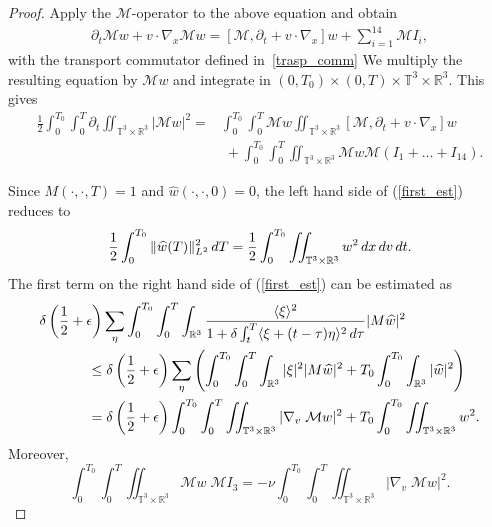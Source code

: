 \documentclass[10pt,a4paper]{amsart}
\newcommand{\CalM}{\mathcal{M}}
\newcommand{\Eps}{\epsilon}
\newcommand{\R}{\mathbb R}
\newcommand{\T}{\mathbb{T}}
\newcommand{\dT}{\, {\rm d} T}
\newcommand{\del}{\partial}
\newcommand{\dtau}{\, {\rm d} \tau}
\newcommand{\dt}{\, {\rm d} t}
\newcommand{\dv}{\, {\rm d} v}
\newcommand{\dx}{\, {\rm d} x}
\newcommand{\vpran}[1]{\left(#1\right)}
\begin{document}
\begin{proof}
Apply the $\CalM$-operator to the above equation and obtain 
\begin{align*}
  \del_t \CalM w  + v \cdot \nabla_x \CalM w
= [\CalM, \partial_t + v \cdot \nabla_x]w + \sum_{i=1}^{14} \CalM  I_i   ,
\end{align*}
with the transport commutator defined in~\eqref{trasp_comm}
We multiply the resulting equation by ${{\CalM} w}$ and integrate in $(0, T_0) \times (0,T) \times \T^3 \times \R^3$. This gives
\begin{align} \label{first_est}
\frac{1}{2}\int_0^{T_0} \int_0^{T}   \partial _t \iint_{\T^3 \times \R^3} |{\CalM} w|^2 
= & \int_0^{T_0}  \int_0^{T}  {\CalM} w  \iint_{\T^3 \times \R^3} [\CalM, \partial_t + v \cdot \nabla_x]w %
\nonumber 
\\
&\;+ \int_0^{T_0}  \int_0^{T}  \iint_{\T^3 \times \R^3}  {{\CalM}w} {\CalM} ( {I_1} + ...+  {I_{14}}). %
\end{align}


Since ${M}(\cdot,\cdot,T)=1$ and $\widehat w(\cdot,\cdot,0)=0$, the left hand side of (\ref{first_est}) reduces to 
$$
\frac{1}{2} \int_0^{T_0} \|\widehat w(T) \|_{L^2}^2 \dT = \frac{1}{2} \int_0^{T_0} \iint_{\T^3 \times \R^3}  w^2 \dx\dv\dt .
$$
The first term on the right hand side of (\ref{first_est}) can be estimated as 
\begin{align*}
 \delta \left(\frac{1}{2}+ \Eps\right)& \sum_{\eta}\int_0^{T_0} \int_0^T \int_{\R^3} \frac{ \langle \xi \rangle^{2}}{{ 1 + \delta \int_t ^T \langle \xi +(t- \tau) \eta\rangle^{2} \dtau}} |{M}\widehat w|^2 %
\\
 \le  & \;\delta  \left(\frac{1}{2}+ \Eps\right)\sum_{\eta} \left( \int_0^{T_0} \int_0^T \int_{\R^3}   
 | \xi |^{2}  |{M}\widehat w|^2 %
 + T_0 \int_0^{T_0} \int_{\R^3}  |\widehat w|^2 
 \right)
\\
 = & \;\delta  \left(\frac{1}{2}+ \Eps\right) \int_0^{T_0} \int_0^T \iint_{\T^3 \times \R^3} |\nabla_v \;\CalM w|^2 %
 + T_0 \int_0^{T_0} \iint_{\T^3 \times \R^3}   w^2. %
\end{align*}
Moreover, 
$$
 \int_0^{T_0} \int_0^T   \iint_{\T^3 \times \R^3} \CalM w  \; {\CalM} { I_3} 
 = - \nu  \int_0^{T_0} \int_0^T  \iint_{\T^3 \times \R^3}   |\nabla_v \; \mathcal{M} w| ^2. %
$$



\end{proof}
\end{document}
